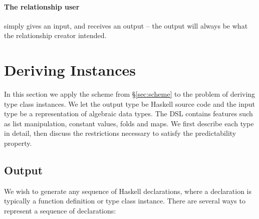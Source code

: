 \documentclass{llncs}
\begin{document}
\paragraph{The relationship user} simply gives an input, and receives an output -- the output will always be what the relationship creator intended.

\section{Deriving Instances}
\label{sec:instances}

In this section we apply the scheme from \S\ref{sec:scheme} to the problem of deriving type class instances. We let the output type be Haskell source code and the input type be a representation of algebraic data types. The DSL contains features such as list manipulation, constant values, folds and maps. We first describe each type in detail, then discuss the restrictions necessary to satisfy the predictability property.

\subsection{Output}
\label{sec:output}

We wish to generate any sequence of Haskell declarations, where a declaration is typically a function definition or type class instance. There are several ways to represent a sequence of declarations:
\end{document}
